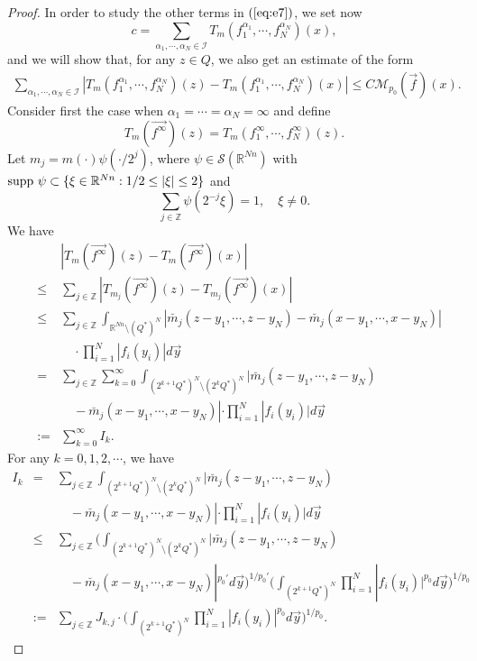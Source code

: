 \documentclass[11pt,oneside,onecolumn]{amsart}
\numberwithin{equation}{section}
\begin{document}
\begin{proof}
In order to study the other terms in $(\ref{eq:e7})$, we set now
\[
  c=\sum_{\alpha_1,\cdots,\alpha_N\in\mathcal{I}}
T_m(f_1^{\alpha_1},\cdots,f_N^{\alpha_N})(x),
\]
and we will show that, for any $z\in Q$, we also get an estimate of the form
\begin{eqnarray}
\sum_{\alpha_1,\cdots,\alpha_N\in\mathcal{I}}
|T_m(f_1^{\alpha_1},\cdots,f_N^{\alpha_N})(z)-T_m(f_1^{\alpha_1},\cdots,f_N^{\alpha_N})(x)|\le C\mathcal{M}_{p_0}(\vec{f})(x).   \label{eq:e8}
\end{eqnarray}
Consider first the case when $\alpha_1=\cdots=\alpha_N=\infty$ and define
\[
  T_m(\vec{f^\infty})(z)=T_m(f_1^\infty,\cdots,f_N^\infty)(z).
\]
Let $m_j=m(\cdot)\psi(\cdot/{2^j})$, where $\psi\in\mathscr{S}({\mathbb{R}}^{Nn})$ with ${{\rm supp}\ } \psi\subset\{\xi\in{\mathbb{R}}^{Nn}: 1/2\le|\xi|\le2\}$ and
\[
  \sum_{j\in{\mathbb{Z}}}\psi(2^{-j}\xi)=1,\quad\mbox{$\xi\neq 0$.}
\]
We have
\begin{eqnarray*}
&&|T_m(\vec{f^\infty})(z)-T_m(\vec{f^\infty})(x)|\\
&\le&\sum_{j\in{\mathbb{Z}}}|T_{m_j}(\vec{f^\infty})(z)-T_{m_j}(\vec{f^\infty})(x)|\\
&\le&\sum_{j\in{\mathbb{Z}}}\int_{{\mathbb{R}}^{Nn}\setminus (Q^*)^N}|\breve{m_j}(z-y_1, \cdots, z-y_N)-\breve{m_j}(x-y_1, \cdots, x-y_N)|\\
&&\quad\cdot
\prod_{i=1}^N|f_i(y_i)|d\vec{y}\\
&=&\sum_{j\in{\mathbb{Z}}}\sum_{k=0}^\infty\int_{(2^{k+1}Q^*)^N\setminus (2^kQ^*)^N}|\breve{m_j}(z-y_1, \cdots, z-y_N)\\
&&\quad-\breve{m_j}(x-y_1, \cdots, x-y_N)|\cdot
\prod_{i=1}^N|f_i(y_i)|d\vec{y}\\
&:=&\sum_{k=0}^\infty I_k.
\end{eqnarray*}
For any $k=0,1,2,\cdots$, we have
\begin{eqnarray*}
I_k&=&\sum_{j\in{\mathbb{Z}}}\int_{(2^{k+1}Q^*)^N\setminus (2^kQ^*)^N}|\breve{m_j}(z-y_1, \cdots, z-y_N)\\
&&\quad-\breve{m_j}(x-y_1, \cdots, x-y_N)|\cdot
\prod_{i=1}^N|f_i(y_i)|d\vec{y}\\
&\le& \sum_{j\in{\mathbb{Z}}}\bigg(\int_{(2^{k+1}Q^*)^N\setminus (2^kQ^*)^N}|\breve{m_j}(z-y_1, \cdots, z-y_N)\\
&&\quad
\!-\breve{m_j}(x-y_1, \cdots, x-y_N)|^{p_0'}d\vec{y}\bigg)^{1/{p_0'}} \!\!
\bigg(\int_{(2^{k+1}Q^*)^N}\prod_{i=1}^N|f_i(y_i)|^{p_0}d\vec{y}\bigg)^{1/{p_0}}\\
&:=&\sum_{j\in{\mathbb{Z}}} J_{k,j}\cdot\bigg(\int_{(2^{k+1}Q^*)^N}\prod_{i=1}^N|f_i(y_i)|^{p_0}d\vec{y}\bigg)^{1/{p_0}}.

\end{eqnarray*}
\end{proof}
\end{document}

